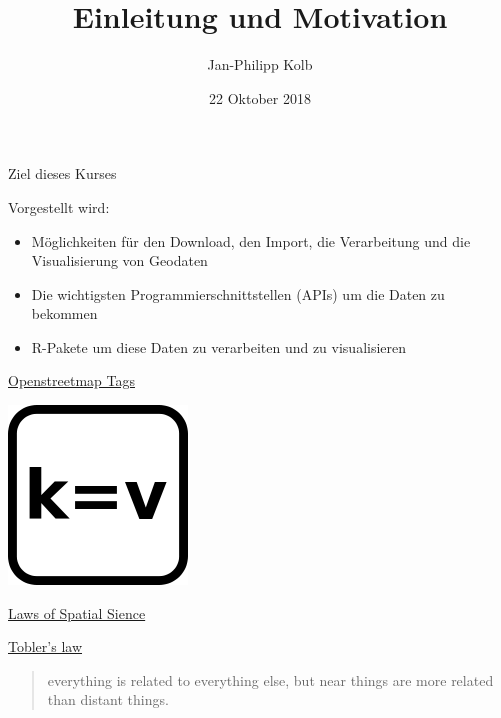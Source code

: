 \documentclass[ignorenonframetext,]{beamer}
\title{Einleitung und Motivation}
\author{Jan-Philipp Kolb}
\date{22 Oktober 2018}
\providecommand{\tightlist}{%
  \setlength{\itemsep}{0pt}\setlength{\parskip}{0pt}}
\begin{document}
\frame{\titlepage}

\begin{frame}

\end{frame}

\begin{frame}{Ziel dieses Kurses}

\begin{block}{Vorgestellt wird:}

\begin{itemize}
\tightlist
\item
  Möglichkeiten für den Download, den Import, die Verarbeitung und die
  Visualisierung von Geodaten
\end{itemize}

\begin{itemize}
\item
  Die wichtigsten Programmierschnittstellen (APIs) um die Daten zu
  bekommen
\item
  R-Pakete um diese Daten zu verarbeiten und zu visualisieren
\end{itemize}

\end{block}

\end{frame}

\begin{frame}{\href{https://wiki.openstreetmap.org/wiki/Tags}{Openstreetmap
Tags}}

\includegraphics{figure/osm_tag.png}

\end{frame}

\begin{frame}{\href{http://de.slideshare.net/rheimann04/big-social-data-the-spatial-turn-in-big-data}{Laws
of Spatial Sience}}

\href{https://en.wikipedia.org/wiki/Tobler's_first_law_of_geography}{Tobler's
law}

\begin{quote}
everything is related to everything else, but near things are more
related than distant things.
\end{quote}

\end{frame}
\end{document}
